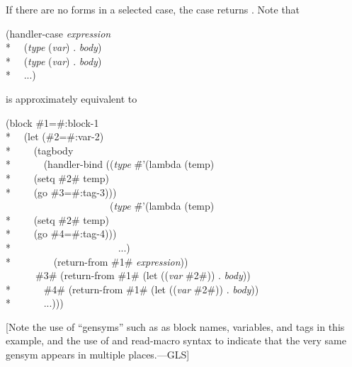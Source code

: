 \begin{defmac}
If there are no forms in a selected case, the case returns .  Note that
\begin{lisp}
(handler-case \emph{expression} \\*
~~(\emph{type} (\emph{var}) . \emph{body}) \\*
~~(\emph{type} (\emph{var}) . \emph{body}) \\*
~~...)
\end{lisp}
is approximately equivalent to
\begin{lisp}
(block \#1=\#:block-1 \\*
~~(let (\#2=\#:var-2) \\*
~~~~(tagbody \\*
~~~~~~(handler-bind ((\emph{type} \=\#'(lambda (temp) \\*
\>~~~~(setq \#2\# temp) \\*
\>~~~~(go \#3=\#:tag-3))) \\
~~~~~~~~~~~~~~~~~~~~~(\emph{type} \=\#'(lambda (temp) \\*
\>~~~~(setq \#2\# temp) \\*
\>~~~~(go \#4=\#:tag-4))) \\*
~~~~~~~~~~~~~~~~~~~~~...) \\*
~~~~~~~~(return-from \#1\# \emph{expression})) \\
~~~~~~\#3\# (return-from \#1\# (let ((\emph{var} \#2\#)) . \emph{body})) \\*
~~~~~~\#4\# (return-from \#1\# (let ((\emph{var} \#2\#)) . \emph{body})) \\*
~~~~~~...)))
\end{lisp}
[Note the use of ``gensyms'' such as 
as block names, variables, and  tags in this example,
and the use of  and  read-macro syntax
to indicate that the very same gensym appears in multiple places.---GLS]


\end{defmac}
